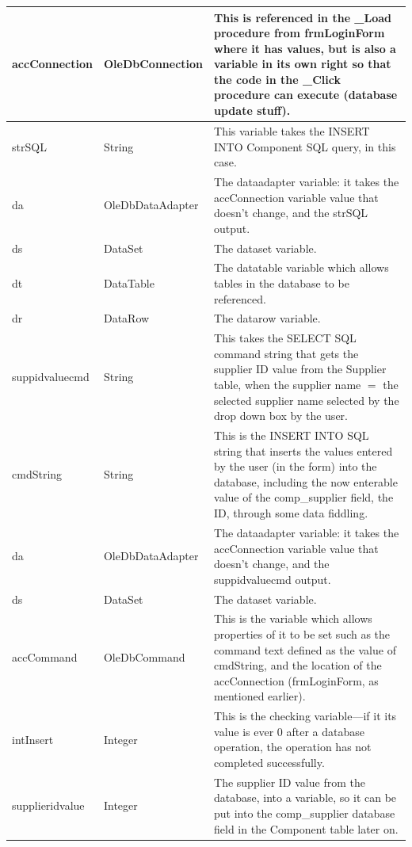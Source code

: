 \begin{longtable}{| p{4cm} | p{3cm} | p{10cm} |}
		\hline
		accConnection & OleDbConnection & This is referenced in the \_Load procedure from frmLoginForm where it has values, but is also a variable in its own right so that the code in the \_Click procedure can execute (database update stuff).\\
		\hline
		strSQL & String & This variable takes the INSERT INTO Component SQL query, in this case.\\
		\hline
		da & OleDbDataAdapter & The dataadapter variable: it takes the accConnection variable value that doesn't change, and the strSQL output.\\
		\hline
		ds & DataSet & The dataset variable.\\
		\hline
		dt & DataTable & The datatable variable which allows tables in the database to be referenced.\\
		\hline
		dr & DataRow & The datarow variable.\\
		\hline
		suppidvaluecmd & String & This takes the SELECT SQL command string that gets the supplier ID value from the Supplier table, when the supplier name $=$ the selected supplier name selected by the drop down box by the user.\\
		\hline
		cmdString & String & This is the INSERT INTO SQL string that inserts the values entered by the user (in the form) into the database, including the now enterable value of the comp\_supplier field, the ID, through some data fiddling.\\
		\hline
		da & OleDbDataAdapter & The dataadapter variable: it takes the accConnection variable value that doesn't change, and the suppidvaluecmd output.\\
		\hline
		ds & DataSet & The dataset variable.\\
		\hline
		accCommand & OleDbCommand & This is the variable which allows properties of it to be set such as the command text defined as the value of cmdString, and the location of the accConnection (frmLoginForm, as mentioned earlier).\\
		\hline
		intInsert & Integer & This is the checking variable---if it its value is ever 0 after a database operation, the operation has not completed successfully.\\
		\hline
		supplieridvalue & Integer & The supplier ID value from the database, into a variable, so it can be put into the comp\_supplier database field in the Component table later on.\\
		\hline
	\end{longtable}
	
